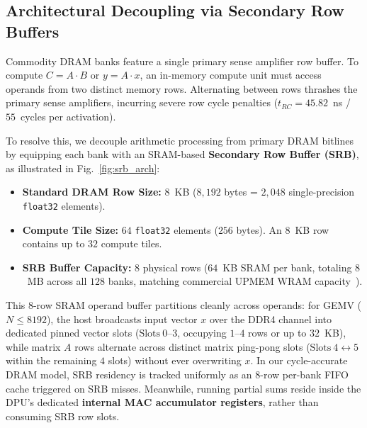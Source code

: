 \documentclass[conference]{IEEEtran}
\begin{document}
\subsection{Architectural Decoupling via Secondary Row Buffers}
Commodity DRAM banks feature a single primary sense amplifier row buffer. To compute $C = A \cdot B$ or $y = A \cdot x$, an in-memory compute unit must access operands from two distinct memory rows. Alternating between rows thrashes the primary sense amplifiers, incurring severe row cycle penalties ($t_{RC} = 45.82$~ns / $55$~cycles per activation).

To resolve this, we decouple arithmetic processing from primary DRAM bitlines by equipping each bank with an SRAM-based \textbf{Secondary Row Buffer (SRB)}, as illustrated in Fig.~\ref{fig:srb_arch}:
\begin{itemize}
    \item \textbf{Standard DRAM Row Size:} $8$~KB ($8,192$ bytes = $2,048$ single-precision \texttt{float32} elements).
    \item \textbf{Compute Tile Size:} $64$ \texttt{float32} elements ($256$ bytes). An $8$~KB row contains up to $32$ compute tiles.
    \item \textbf{SRB Buffer Capacity:} $8$ physical rows ($64$~KB SRAM per bank, totaling $8$~MB across all $128$ banks, matching commercial UPMEM WRAM capacity~\cite{devaux2019true}).
\end{itemize}

This 8-row SRAM operand buffer partitions cleanly across operands: for GEMV ($N \le 8192$), the host broadcasts input vector $x$ over the DDR4 channel into dedicated pinned vector slots ($\text{Slots}~0\text{--}3$, occupying $1\text{--}4$ rows or up to $32$~KB), while matrix $A$ rows alternate across distinct matrix ping-pong slots ($\text{Slots}~4 \leftrightarrow 5$ within the remaining $4$ slots) without ever overwriting $x$. In our cycle-accurate DRAM model, SRB residency is tracked uniformly as an 8-row per-bank FIFO cache triggered on SRB misses. Meanwhile, running partial sums reside inside the DPU's dedicated \textbf{internal MAC accumulator registers}, rather than consuming SRB row slots.
\end{document}
